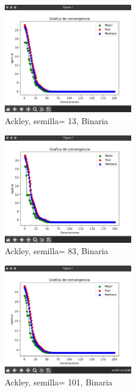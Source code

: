 \documentclass{report}
\begin{document}
    \begin{figure}[h]
        \centering
        \includegraphics[width=0.5\textwidth]{ackley_13_bin.jpeg}
        \caption{Ackley, semilla= 13, Binaria}
    \end{figure}
    \begin{figure}[p]
        \centering
        \includegraphics[width=0.5\textwidth]{ackley_83_bin.jpeg}
        \caption{Ackley, semilla= 83, Binaria}
    \end{figure}
    \begin{figure}[p]
        \centering
        \includegraphics[width=0.5\textwidth]{ackley_101_bin.jpeg}
        \caption{Ackley, semilla= 101, Binaria}
    \end{figure}
\end{document}
